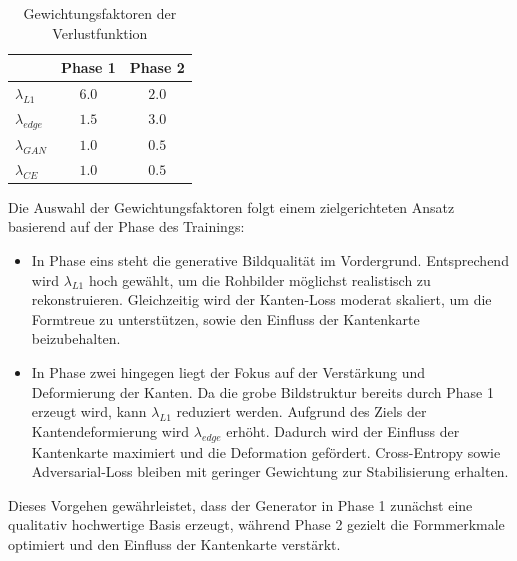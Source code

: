 {%

\begin{table}[h]
    \centering
    \begin{tabular}[h]{lcc}
        \toprule
        & \textbf{Phase 1} & \textbf{Phase 2} \\
        \midrule
        $\lambda_{L1}$ & $6.0$ & $2.0$ \\
        $\lambda_{edge}$ & $1.5$ & $3.0$\\
        $\lambda_{GAN}$ & $1.0$ & $0.5$\\
        $\lambda_{CE}$ & $1.0$ & $0.5$\\
        \bottomrule
    \end{tabular}
    \caption{Gewichtungsfaktoren der Verlustfunktion}
    \label{tab:lambda_verlustfkt}
\end{table}

Die Auswahl der Gewichtungsfaktoren folgt einem zielgerichteten Ansatz basierend auf der Phase des Trainings:
\begin{itemize}
    \item In Phase eins steht die generative Bildqualität im Vordergrund. Entsprechend wird $\lambda_{L1}$ hoch gewählt, um die Rohbilder möglichst realistisch zu rekonstruieren. Gleichzeitig wird der Kanten-Loss moderat skaliert, um die Formtreue zu unterstützen, sowie den Einfluss der Kantenkarte beizubehalten.
    \item In Phase zwei hingegen liegt der Fokus auf der Verstärkung und Deformierung der Kanten. Da die grobe Bildstruktur bereits durch Phase 1 erzeugt wird, kann $\lambda_{L1}$ reduziert werden. Aufgrund des Ziels der Kantendeformierung wird $\lambda_{edge}$ erhöht. Dadurch wird der Einfluss der Kantenkarte maximiert und die Deformation gefördert. Cross-Entropy sowie Adversarial-Loss bleiben mit geringer Gewichtung zur Stabilisierung erhalten.
\end{itemize}
Dieses Vorgehen gewährleistet, dass der Generator in Phase 1 zunächst eine qualitativ hochwertige Basis erzeugt, während Phase 2 gezielt die Formmerkmale optimiert und den Einfluss der Kantenkarte verstärkt.





}
